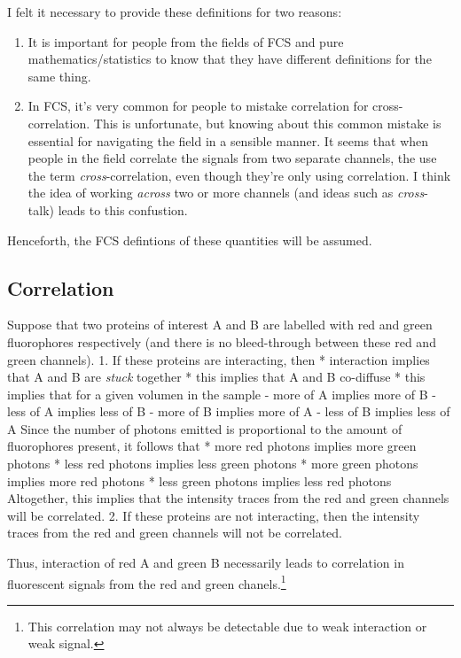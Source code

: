 \documentclass[12pt,]{book}
\providecommand{\tightlist}{%
  \setlength{\itemsep}{0pt}\setlength{\parskip}{0pt}}
\let\rmarkdownfootnote\footnote%
\def\footnote{\protect\rmarkdownfootnote}
\theoremstyle{definition}
\theoremstyle{definition}
\theoremstyle{definition}
\theoremstyle{remark}
\begin{document}
I felt it necessary to provide these definitions for two reasons:

\begin{enumerate}
\def\labelenumi{\arabic{enumi}.}
\tightlist
\item
  It is important for people from the fields of FCS and pure
  mathematics/statistics to know that they have different definitions
  for the same thing.
\item
  In FCS, it's very common for people to mistake correlation for
  cross-correlation. This is unfortunate, but knowing about this common
  mistake is essential for navigating the field in a sensible manner. It
  seems that when people in the field correlate the signals from two
  separate channels, the use the term \emph{cross}-correlation, even
  though they're only using correlation. I think the idea of working
  \emph{across} two or more channels (and ideas such as
  \emph{cross}-talk) leads to this confustion.
\end{enumerate}

Henceforth, the FCS defintions of these quantities will be assumed.

\subsection{Correlation}\label{correlation}

Suppose that two proteins of interest A and B are labelled with red and
green fluorophores respectively (and there is no bleed-through between
these red and green channels). 1. If these proteins are interacting,
then * interaction implies that A and B are \emph{stuck} together * this
implies that A and B co-diffuse * this implies that for a given volumen
in the sample - more of A implies more of B - less of A implies less of
B - more of B implies more of A - less of B implies less of A Since the
number of photons emitted is proportional to the amount of fluorophores
present, it follows that * more red photons implies more green photons *
less red photons implies less green photons * more green photons implies
more red photons * less green photons implies less red photons
Altogether, this implies that the intensity traces from the red and
green channels will be correlated. 2. If these proteins are not
interacting, then the intensity traces from the red and green channels
will not be correlated.

Thus, interaction of red A and green B necessarily leads to correlation
in fluorescent signals from the red and green chanels.\footnote{This
  correlation may not always be detectable due to weak interaction or
  weak signal.}
\end{document}
